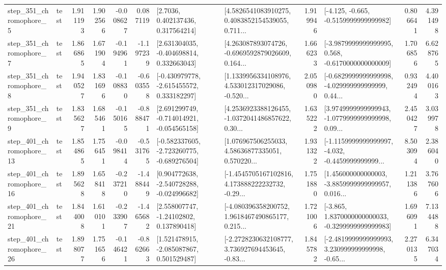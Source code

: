 \begin{tabular}{llrrrrllrlrr}
   step\_351\_chromophore\_5 &      test &      1.911193 &    1.902566 &     -0.008627 &  0.087119 &          [2.7036, 0.402137436, 0.317564214] &  [4.5826541083910275, 0.4083852154539055, 0.711... &       1.919946 &              [-4.125, -0.665, -0.5159999999999982] &            0.806641 &          4.391498 \\
   step\_351\_chromophore\_7 &      test &      1.866865 &    1.671904 &     -0.194961 & -1.197239 &    [2.631304035, -0.404698814, 0.332663043] &  [4.263087893074726, -0.6969592879026609, 0.164... &       1.666233 &  [-3.9879999999999995, 0.568, -0.6170000000000009] &            1.706856 &          6.628765 \\
   step\_351\_chromophore\_8 &      test &      1.940527 &    1.831696 &     -0.108830 & -0.603558 &   [-0.430979778, -2.615455572, 0.333182297] &  [1.1339956334108976, 4.533012317029086, -0.520... &       2.050980 &  [-0.6829999999999998, -4.029999999999999, 0.44... &            0.932494 &          4.400163 \\
   step\_351\_chromophore\_9 &      test &      1.835627 &    1.685461 &     -0.150165 & -0.888471 &   [2.691299749, -0.714014921, -0.054565158] &  [4.2536923388126455, -1.0372041486857622, 0.30... &       1.635222 &  [3.9749999999999943, -1.0779999999999998, 0.09... &            2.450427 &          3.039978 \\
  step\_401\_chromophore\_13 &      test &      1.854865 &    1.756451 &     -0.098414 & -0.531765 &  [-0.582337605, -2.723260775, -0.689276504] &  [1.076967506255033, 4.58636877335051, 0.570220... &       1.931322 &  [-1.1159999999999997, -4.032, -0.4459999999999... &            8.503094 &          2.386040 \\
  step\_401\_chromophore\_16 &      test &      1.895628 &    1.658418 &     -0.237210 & -1.488449 &   [0.904772638, -2.540728288, -0.024996682] &  [-1.4545705167102816, 4.173888222232732, -0.29... &       1.751880 &  [1.456000000000003, -3.8859999999999957, 0.016... &            1.211386 &          3.767606 \\
  step\_401\_chromophore\_21 &      test &      1.844008 &    1.610101 &     -0.233907 & -1.465682 &     [2.558007747, -1.24102802, 0.137890418] &  [-4.080396358200752, 1.9618467490865177, 0.215... &       1.721006 &  [-3.865, 1.8370000000000033, -0.3299999999999983] &            1.696091 &          7.134488 \\
  step\_401\_chromophore\_26 &      test &      1.898077 &    1.751656 &     -0.146421 & -0.862663 &    [1.521478915, -2.085087867, 0.501529487] &  [-2.2728230632108777, 3.736927694453645, -0.83... &       1.845782 &  [-2.4819999999999993, 3.230999999999998, -0.65... &            2.270135 &          6.347034 \\

\end{tabular}
